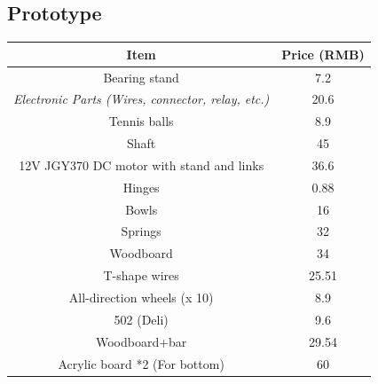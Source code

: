 \documentclass{article}
\begin{document}
\subsection{Prototype}
\begin{table}[H]
\centering
\begin{tabular}{|c|c|c|c|}
\hline
\multicolumn{ 2}{|c|}{Item} & \multicolumn{ 2}{|c|}{Price (RMB)} \\
\hline
\multicolumn{ 2}{|c|}{Bearing stand} & \multicolumn{ 2}{|c|}{7.2} \\

\multicolumn{ 2}{|c|}{{\it Electronic Parts (Wires, connector, relay, etc.)}} & \multicolumn{ 2}{|c|}{20.6} \\

\multicolumn{ 2}{|c|}{Tennis balls} & \multicolumn{ 2}{|c|}{8.9} \\

\multicolumn{ 2}{|c|}{Shaft} & \multicolumn{ 2}{|c|}{45} \\

\multicolumn{ 2}{|c|}{12V JGY370 DC motor with stand and links} & \multicolumn{ 2}{|c|}{36.6} \\

\multicolumn{ 2}{|c|}{Hinges} & \multicolumn{ 2}{|c|}{0.88} \\

\multicolumn{ 2}{|c|}{Bowls} & \multicolumn{ 2}{|c|}{16} \\

\multicolumn{ 2}{|c|}{Springs} & \multicolumn{ 2}{|c|}{32} \\

\multicolumn{ 2}{|c|}{Woodboard} & \multicolumn{ 2}{|c|}{34} \\

\multicolumn{ 2}{|c|}{T-shape wires} & \multicolumn{ 2}{|c|}{25.51} \\

\multicolumn{ 2}{|c|}{All-direction wheels (x 10)} & \multicolumn{ 2}{|c|}{8.9} \\

\multicolumn{ 2}{|c|}{502 (Deli)} & \multicolumn{ 2}{|c|}{9.6} \\

\multicolumn{ 2}{|c|}{Woodboard+bar} & \multicolumn{ 2}{|c|}{29.54} \\

\multicolumn{ 2}{|c|}{Acrylic board *2 (For bottom)} & \multicolumn{ 2}{|c|}{60} \\


\end{tabular}
\end{table}
\end{document}
